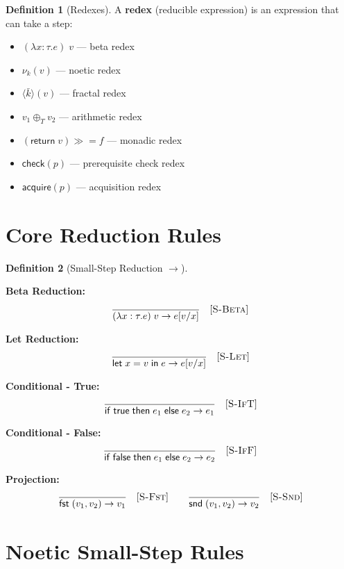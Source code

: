 \documentclass[11pt,twoside,openright]{book}
\theoremstyle{definition}
\newtheorem{definition}{Definition}[chapter]
\theoremstyle{plain}
\theoremstyle{remark}
\newcommand{\noe}[1]{\nu_{#1}}
\newcommand{\Tadd}{\oplus_T}
\newcommand{\rpmret}{\mathsf{return}}
\newcommand{\rpmbind}{\mathbin{\gg\!=}}
\newcommand{\smallstep}{\to}
\begin{document}
\begin{definition}[Redexes]
\label{def:redexes}
A \textbf{redex} (reducible expression) is an expression that can take a step:
\begin{itemize}
  \item $(\lambda x:\tau. e)\; v$ --- beta redex
  \item $\noe{k}(v)$ --- noetic redex
  \item $\langle \bar{k} \rangle(v)$ --- fractal redex
  \item $v_1 \Tadd v_2$ --- arithmetic redex
  \item $(\rpmret\; v) \rpmbind f$ --- monadic redex
  \item $\mathsf{check}(p)$ --- prerequisite check redex
  \item $\mathsf{acquire}(p)$ --- acquisition redex
\end{itemize}
\end{definition}

\section{Core Reduction Rules}

\begin{definition}[Small-Step Reduction $\smallstep$]
\label{def:smallstep-rules}

\textbf{Beta Reduction:}
\[
\frac{}
{(\lambda x:\tau. e)\; v \smallstep e[v/x]} \quad [\textsc{S-Beta}]
\]

\textbf{Let Reduction:}
\[
\frac{}
{\mathsf{let}\; x = v \;\mathsf{in}\; e \smallstep e[v/x]} \quad [\textsc{S-Let}]
\]

\textbf{Conditional - True:}
\[
\frac{}
{\mathsf{if}\; \mathsf{true} \;\mathsf{then}\; e_1 \;\mathsf{else}\; e_2 \smallstep e_1} \quad [\textsc{S-IfT}]
\]

\textbf{Conditional - False:}
\[
\frac{}
{\mathsf{if}\; \mathsf{false} \;\mathsf{then}\; e_1 \;\mathsf{else}\; e_2 \smallstep e_2} \quad [\textsc{S-IfF}]
\]

\textbf{Projection:}
\[
\frac{}
{\mathsf{fst}\; (v_1, v_2) \smallstep v_1} \quad [\textsc{S-Fst}]
\qquad
\frac{}
{\mathsf{snd}\; (v_1, v_2) \smallstep v_2} \quad [\textsc{S-Snd}]
\]
\end{definition}

\section{Noetic Small-Step Rules}
\end{document}
